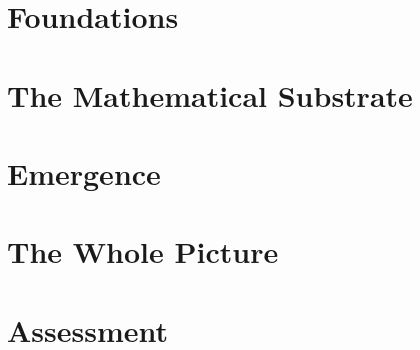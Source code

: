 \documentclass{article}
\begin{document}
\maketitle



\tableofcontents

\part{Foundations}





\part{The Mathematical Substrate}






\part{Emergence}





\part{The Whole Picture}





\part{Assessment}




\appendix



\end{document}
